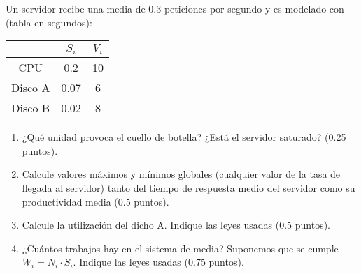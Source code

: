 \documentclass[12pt]{article}
\begin{document}
    \begin{ejercicio}[2 puntos]
        Un servidor recibe una media de $0.3$ peticiones por segundo y es modelado con (tabla en segundos):
        \begin{table}[H]
        \centering
        \begin{tabular}{c|c|c}
            & $S_i$ & $V_i$ \\
            \hline
            CPU & 0.2 & 10 \\
            Disco A & 0.07 & 6 \\
            Disco B & 0.02 & 8
        \end{tabular}
        \end{table}

        \begin{enumerate}[label=\alph*)]
            \item ¿Qué unidad provoca el cuello de botella? ¿Está el servidor saturado? (0.25 puntos).
            \item Calcule valores máximos y mínimos globales (cualquier valor de la tasa de llegada al servidor) tanto del tiempo de respuesta medio del servidor como su productividad media (0.5 puntos).
            \item Calcule la utilización del dicho A. Indique las leyes usadas (0.5 puntos).
            \item ¿Cuántos trabajos hay en el sistema de media? Suponemos que se cumple $W_i = N_i\cdot S_i$. Indique las leyes usadas (0.75 puntos).
        \end{enumerate}
    \end{ejercicio}
\end{document}
